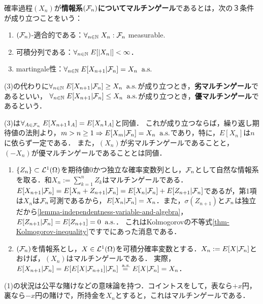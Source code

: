 \documentclass[uplatex,dvipdfmx]{jsreport}
\begin{document}
\begin{definition}
    確率過程$(X_n)$が\textbf{情報系$(\mathcal{F}_n)$についてマルチンゲール}であるとは，次の３条件が成り立つことをいう：
    \begin{enumerate}
        \item $(\mathcal{F}_n)$-適合的である：$\forall_{n\in\mathbb{N}}\;X_n:\mathcal{F}_n$ measurable.
        \item 可積分列である：$\forall_{n\in\mathbb{N}}\;E[\lvert X_n\rvert]<\infty$．
        \item martingale性：$\forall_{n\in\mathbb{N}}\;E[X_{n+1}|\mathcal{F}_n]=X_n\;\;\mathrm{a.s.}$
    \end{enumerate}
    (3)の代わりに$\forall_{n\in\mathbb{N}}\;E[X_{n+1}|\mathcal{F}_n]\ge X_n\;\;\mathrm{a.s.}$が成り立つとき，\textbf{劣マルチンゲール}であるといい，
    $\forall_{n\in\mathbb{N}}\;E[X_{n+1}|\mathcal{F}_n]\le X_n\;\;\mathrm{a.s.}$が成り立つとき，\textbf{優マルチンゲール}であるという．
\end{definition}
\begin{remarks}
    (3)は$\forall_{A\in\mathcal{F}_n}\;E[X_{n+1}1_A]=E[X_n1_A]$と同値．
    これが成り立つならば，繰り返し期待値の法則より，$m>n\ge1\Rightarrow E[X_m|\mathcal{F}_n]=X_n\;\;\mathrm{a.s.}$であり，特に，$E[X_n]$は$n$に依らず一定である．
    また，$(X_n)$が劣マルチンゲールであることと，$(-X_n)$が優マルチンゲールであることとは同値．
\end{remarks}

\begin{example}\mbox{}
    \begin{enumerate}
        \item $\{Z_n\}\subset\mathcal{L}^1(\Omega)$を期待値$0$かつ独立な確率変数列とし，$\mathcal{F}_n$として自然な情報系を取る．和$X_n:=\sum^n_{k=1}Z_k$はマルチンゲールである．
        $E[X_{n+1}|\mathcal{F}_n]=E[X_n+Z_{n+1}|\mathcal{F}_n]=E[X_n|\mathcal{F}_n]+E[Z_{n+1}|\mathcal{F}_n]$であるが，第1項は$X_n$は$\mathcal{F}_n$可測であるから，$E[X_n|\mathcal{F}_n]=X_n$．また，$\sigma(Z_{n+1})$と$\mathcal{F}_n$は独立だから\ref{lemma-independentness-variable-and-algebra}，$E[Z_{n+1}|\mathcal{F}_n]=E[Z_{n+1}]=0\;\;\mathrm{a.s.}$．
        これはKolmogorovの不等式\ref{thm-Kolmogorov-inequality}ですでにあった消息である．
        \item $(\mathcal{F}_n)$を情報系とし，$X\in\mathcal{L}^1(\Omega)$を可積分確率変数とする．$X_n:=E[X|\mathcal{F}_n]$とおけば，$(X_n)$はマルチンゲールである．
        実際，$E[X_{n+1}|\mathcal{F}_n]=E[E[X|\mathcal{F}_{n+1}]|\mathcal{F}_n]\overset{\;\mathrm{a.s.}}{=}E[X|\mathcal{F}_n]=X_n$．
    \end{enumerate}
    (1)の状況は公平な賭けなどの意味論を持つ．コイントスをして，表なら$+x$円，裏なら$-x$円の賭けで，所持金を$X_n$とすると，これはマルチンゲールである．
\end{example}
\end{document}

